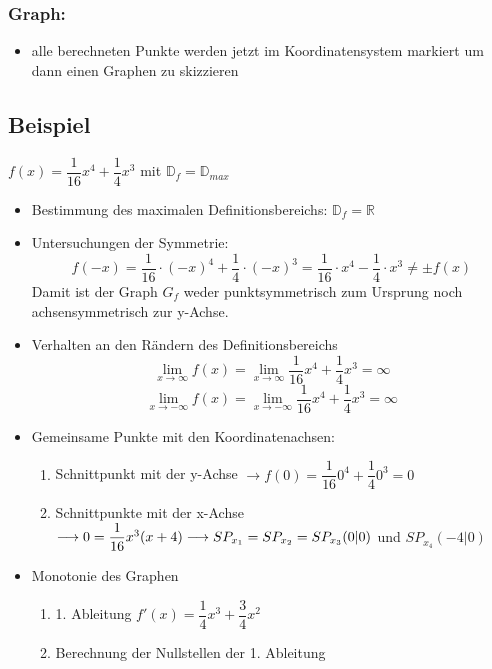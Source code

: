 \documentclass[a4paper,twocolumn,10pt]{onepgnote}
\begin{document}
 \subsubsection{Graph:}
 \begin{itemize}
     \item alle berechneten Punkte werden jetzt im Koordinatensystem markiert um dann einen Graphen zu skizzieren
      \end{itemize}
   \subsection{Beispiel} 
   $f(x)= \dfrac{1}{16} x^4 +\dfrac{1}{4} x^3$ mit $\mathds{D}_f =\mathds{D}_{max}$ 
     \begin{itemize}
         \item Bestimmung des maximalen Definitionsbereichs: $\mathds{D}_f = \mathds{R}$ 
         \item Untersuchungen der Symmetrie:
    $$f(-x) = \frac{1}{16} \cdot (-x)^4 + \frac{1}{4} \cdot (-x)^3 = \frac{1}{16} \cdot x^4 - \frac{1}{4} \cdot x^3 \neq \pm f(x)$$ Damit ist der Graph $G_f$ weder punktsymmetrisch zum Ursprung noch achsensymmetrisch zur y-Achse.
    \item Verhalten an den Rändern des Definitionsbereichs
    $$\lim_{x\rightarrow \infty} f(x) = \lim_{x\rightarrow \infty} \dfrac{1}{16}x^4 +\dfrac{1}{4}x^3 = \infty$$
        $$\lim_{x\rightarrow -\infty} f(x) = \lim_{x\rightarrow -\infty} \dfrac{1}{16}x^4 +\dfrac{1}{4}x^3 = \infty$$
    \item Gemeinsame Punkte mit den Koordinatenachsen:\\
    \begin{enumerate}
    \item Schnittpunkt mit der y-Achse $\longrightarrow f(0) = \dfrac{1}{16}0^4 +\dfrac{1}{4}0^3 = 0$ \\
    \item Schnittpunkte mit der x-Achse $\longrightarrow 0 = \dfrac{1}{16} x^3 (x+4) \\\longrightarrow SP_{x_1} = SP_{x_2} = SP_{x_3}(0|0)$ und $SP_{x_4}(-4|0)$
    \end{enumerate}
    \item Monotonie des Graphen\\
    \begin{enumerate}
    \item 1. Ableitung $f'(x)= \dfrac{1}{4} x^3 +\dfrac{3}{4} x^2$\\
    \item Berechnung der Nullstellen der 1. Ableitung\\

\end{enumerate}
\end{itemize}
\end{document}
